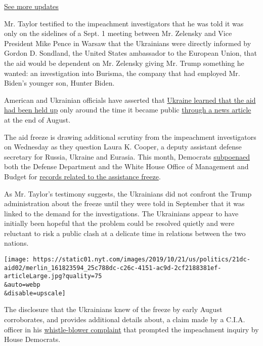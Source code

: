 \href{https://www.nytimes.com/2020/07/31/us/elections/biden-vs-trump.html?action=click\&pgtype=Article\&state=default\&region=MAIN_CONTENT_1\&context=storylines_live_updates}{See
more updates}

Mr. Taylor testified to the impeachment investigators that he was told
it was only on the sidelines of a Sept. 1 meeting between Mr. Zelensky
and Vice President Mike Pence in Warsaw that the Ukrainians were
directly informed by Gordon D. Sondland, the United States ambassador to
the European Union, that the aid would be dependent on Mr. Zelensky
giving Mr. Trump something he wanted: an investigation into Burisma, the
company that had employed Mr. Biden's younger son, Hunter Biden.

American and Ukrainian officials have asserted that
\href{https://www.buzzfeednews.com/article/christopherm51/ukraine-unaware-aid-holdup-month-after-trump-call}{Ukraine
learned that the aid had been held up} only around the time it became
public
\href{https://www.politico.com/story/2019/08/28/trump-ukraine-military-aid-russia-1689531}{through
a news article} at the end of August.

The aid freeze is drawing additional scrutiny from the impeachment
investigators on Wednesday as they question Laura K. Cooper, a deputy
assistant defense secretary for Russia, Ukraine and Eurasia. This month,
Democrats
\href{https://www.documentcloud.org/documents/6506712-Democrats-Subpoena-The-Pentagon-For-Records.html}{subpoenaed}
both the Defense Department and the White House Office of Management and
Budget for
\href{https://intelligence.house.gov/uploadedfiles/omb_subpoena_schedule_10-07-19_hpsci.pdf}{records
related to the assistance freeze}.

As Mr. Taylor's testimony suggests, the Ukrainians did not confront the
Trump administration about the freeze until they were told in September
that it was linked to the demand for the investigations. The Ukrainians
appear to have initially been hopeful that the problem could be resolved
quietly and were reluctant to risk a public clash at a delicate time in
relations between the two nations.

\texttt{[image: https://static01.nyt.com/images/2019/10/21/us/politics/21dc-aid02/merlin\_161823594\_25c788dc-c26c-4151-ac9d-2cf2188381ef-articleLarge.jpg?quality=75\\\&auto=webp\\\&disable=upscale]}

The disclosure that the Ukrainians knew of the freeze by early August
corroborates, and provides additional details about, a claim made by a
C.I.A. officer in his
\href{https://www.nytimes.com/interactive/2019/09/26/us/politics/whistle-blower-complaint.html}{whistle-blower
complaint} that prompted the impeachment inquiry by House Democrats.

